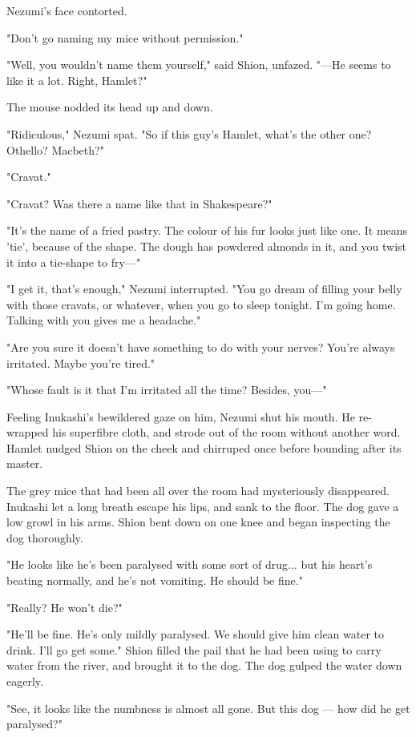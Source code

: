 Nezumi's face contorted.

"Don't go naming my mice without permission."

"Well, you wouldn't name them yourself," said Shion, unfazed. "---He seems
to like it a lot. Right, Hamlet?"

The mouse nodded its head up and down.

"Ridiculous," Nezumi spat. "So if this guy's Hamlet, what's the other
one? Othello? Macbeth?"

"Cravat."

"Cravat? Was there a name like that in Shakespeare?"

"It's the name of a fried pastry. The colour of his fur looks just like
one. It means 'tie', because of the shape. The dough has powdered
almonds in it, and you twist it into a tie-shape to fry---"

"I get it, that's enough," Nezumi interrupted. "You go dream of filling
your belly with those cravats, or whatever, when you go to sleep
tonight. I'm going home. Talking with you gives me a headache."

"Are you sure it doesn't have something to do with your nerves? You're
always irritated. Maybe you're tired."

"Whose fault is it that I'm irritated all the time? Besides, you---"

Feeling Inukashi's bewildered gaze on him, Nezumi shut his mouth. He
re-wrapped his superfibre cloth, and strode out of the room without
another word. Hamlet nudged Shion on the cheek and chirruped once before
bounding after its master.

The grey mice that had been all over the room had mysteriously
disappeared. Inukashi let a long breath escape his lips, and sank to the
floor. The dog gave a low growl in his arms. Shion bent down on one knee
and began inspecting the dog thoroughly.

"He looks like he's been paralysed with some sort of drug... but his
heart's beating normally, and he's not vomiting. He should be fine."

"Really? He won't die?"

"He'll be fine. He's only mildly paralysed. We should give him clean
water to drink. I'll go get some." Shion filled the pail that he had
been using to carry water from the river, and brought it to the dog. The
dog gulped the water down eagerly.

"See, it looks like the numbness is almost all gone. But this dog --- how
did he get paralysed?"


